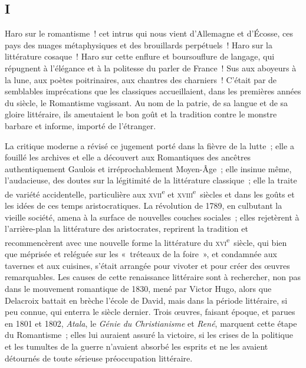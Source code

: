 \documentclass[french,twoside]{book} %
\begin{document}
\subsection[{I}]{I}
\noindent Haro sur le romantisme ! cet intrus qui nous vient d’Allemagne et d’Écosse, ces pays des nuages métaphysiques et des brouillards perpétuels ! Haro sur la littérature cosaque ! Haro sur cette enflure et boursouflure de langage, qui répugnent à l’élégance et à la politesse du parler de France ! Sus aux aboyeurs à la lune, aux poètes poitrinaires, aux chantres des charniers ! C’était par de semblables imprécations que les classiques accueillaient, dans les premières années du siècle, le Romantisme vagissant. Au nom de la patrie, de sa langue et de sa gloire littéraire, ils ameutaient le bon goût et la tradition contre le monstre barbare et informe, importé de l’étranger.\par
La critique moderne a révisé ce jugement porté dans la fièvre de la lutte ; elle a fouillé les archives et elle a découvert aux Romantiques des ancêtres authentiquement Gaulois et irréprochablement Moyen-Âge ; elle insinue même, l’audacieuse, des doutes sur la légitimité de la littérature classique ; elle la traite de variété accidentelle, particulière aux \textsc{xvii}\textsuperscript{e} et \textsc{xviii}\textsuperscript{e} siècles et dans les goûts et les idées de ces temps  
\label{p578}aristocratiques. La révolution de 1789, en culbutant la vieille société, amena à la surface de nouvelles couches sociales ; elles rejetèrent à l’arrière-plan la littérature des aristocrates, reprirent la tradition et recommencèrent avec une nouvelle forme la littérature du \textsc{xvi}\textsuperscript{e} siècle, qui bien que méprisée et reléguée sur les « tréteaux de la foire », et condamnée aux tavernes et aux cuisines, s’était arrangée pour vivoter et pour créer des œuvres remarquables. Les causes de cette renaissance littéraire sont à rechercher, non pas dans le mouvement romantique de 1830, mené par Victor Hugo, alors que Delacroix battait en brèche l’école de David, mais dans la période littéraire, si peu connue, qui enterra le siècle dernier. Trois œuvres, faisant époque, et parues en 1801 et 1802, \emph{Atala}, le \emph{Génie du Christianisme} et \emph{René}, marquent cette étape du Romantisme ; elles lui auraient assuré la victoire, si les crises de la politique et les tumultes de la guerre n’avaient absorbé les esprits et ne les avaient détournés de toute sérieuse préoccupation littéraire.\par
\end{document}
